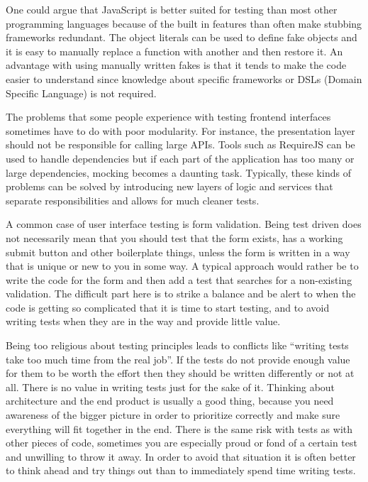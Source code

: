 \documentclass[11pt]{article}
\begin{document}

One could argue that JavaScript is better suited for testing than most other programming languages because of the built in features than often make stubbing frameworks redundant. The object literals can be used to define fake objects and it is easy to manually replace a function with another and then restore it. An advantage with using manually written fakes is that it tends to make the code easier to understand since knowledge about specific frameworks or DSLs (Domain Specific Language) is not required. \cite[questions~20-21]{Edelstam}\label{LiteralFakes}

The problems that some people experience with testing frontend interfaces sometimes have to do with poor modularity. For instance, the presentation layer should not be responsible for calling large APIs. Tools such as RequireJS can be used to handle dependencies but if each part of the application has too many or large dependencies, mocking becomes a daunting task. Typically, these kinds of problems can be solved by introducing new layers of logic and services that separate responsibilities and allows for much cleaner tests. \cite[question~23]{Edelstam}

A common case of user interface testing is form validation. Being test driven does not necessarily mean that you should test that the form exists, has a working submit button and other boilerplate things, unless the form is written in a way that is unique or new to you in some way. A typical approach would rather be to write the code for the form and then add a test that searches for a non-existing validation. The difficult part here is to strike a balance and be alert to when the code is getting so complicated that it is time to start testing, and to avoid writing tests when they are in the way and provide little value. \cite[questions~24-25]{Edelstam}

Being too religious about testing principles leads to conflicts like ``writing tests take too much time from the real job''. If the tests do not provide enough value for them to be worth the effort then they should be written differently or not at all. There is no value in writing tests just for the sake of it. Thinking about architecture and the end product is usually a good thing, because you need awareness of the bigger picture in order to prioritize correctly and make sure everything will fit together in the end. There is the same risk with tests as with other pieces of code, sometimes you are especially proud or fond of a certain test and unwilling to throw it away. In order to avoid that situation it is often better to think ahead and try things out than to immediately spend time writing tests. \cite[question~27]{Edelstam}
\end{document}
